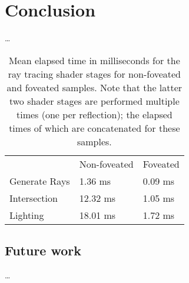 
\section{Conclusion}
\ldots




\begin{table}[h]
\begin{tabular}{lll}
  & Non-foveated & Foveated \\
  Generate Rays & 1.36\phantom{0} ms & 0.09 ms \\
  Intersection & 12.32 ms & 1.05 ms \\
  Lighting & 18.01 ms & 1.72 ms
\end{tabular}
\caption{Mean elapsed time in milliseconds for the ray tracing shader stages for non-foveated and foveated samples. Note that the latter two shader stages are performed multiple times (one per reflection); the elapsed times of which are concatenated for these samples.}
\end{table}

\subsection{Future work}
\ldots



